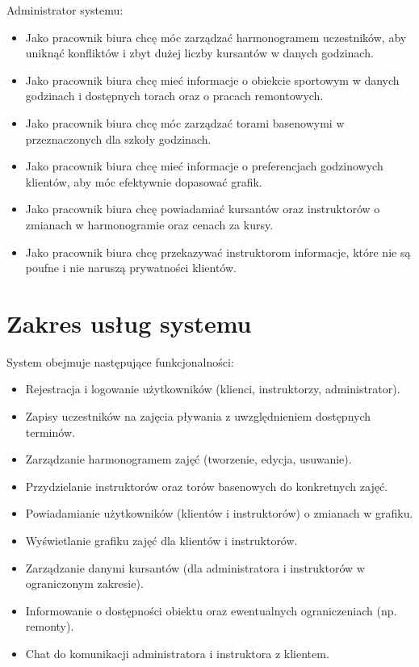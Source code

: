 \documentclass[a4paper,12pt]{article}
\begin{document}
\noindent Administrator systemu:

\begin{itemize}
    \item Jako pracownik biura chcę móc zarządzać harmonogramem uczestników, aby uniknąć konfliktów i zbyt dużej liczby kursantów w danych godzinach.
    \item Jako pracownik biura chcę mieć informacje o obiekcie sportowym w danych godzinach i dostępnych torach oraz o pracach remontowych.
    \item Jako pracownik biura chcę móc zarządzać torami basenowymi w przeznaczonych dla szkoły godzinach.
    \item Jako pracownik biura chcę mieć informacje o preferencjach godzinowych klientów, aby móc efektywnie dopasować grafik.
    \item Jako pracownik biura chcę powiadamiać kursantów oraz instruktorów o zmianach w harmonogramie oraz cenach za kursy.
    \item Jako pracownik biura chcę przekazywać instruktorom informacje, które nie są poufne i nie naruszą prywatności klientów.
\end{itemize}

\section{Zakres usług systemu}

System obejmuje następujące funkcjonalności:

\begin{itemize}
    \item Rejestracja i logowanie użytkowników (klienci, instruktorzy, administrator).
    \item Zapisy uczestników na zajęcia pływania z uwzględnieniem dostępnych terminów.
    \item Zarządzanie harmonogramem zajęć (tworzenie, edycja, usuwanie).
    \item Przydzielanie instruktorów oraz torów basenowych do konkretnych zajęć.
    \item Powiadamianie użytkowników (klientów i instruktorów) o zmianach w grafiku.
    \item Wyświetlanie grafiku zajęć dla klientów i instruktorów.
    \item Zarządzanie danymi kursantów (dla administratora i instruktorów w ograniczonym zakresie).
    \item Informowanie o dostępności obiektu oraz ewentualnych ograniczeniach (np. remonty).
    \item Chat do komunikacji administratora i instruktora z klientem.
\end{itemize}
\end{document}
